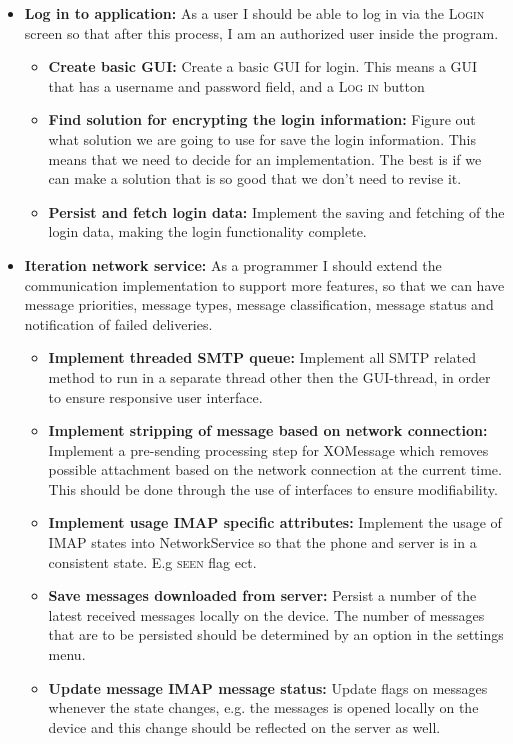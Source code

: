 \begin{itemize}
\item{}\textbf{Log in to application:} As a user I should be able to log in via the \textsc{Login} screen so that after this process, I am an authorized user inside the program.
\begin{itemize}
\item{}\textbf{Create basic GUI:} Create a basic GUI for login. This means a GUI that has a username and password field, and a \textsc{Log in} button
\item{}\textbf{Find solution for encrypting the login information:} Figure out what solution we are going to use for save the login information. This means that we need to decide for an implementation. The best is if we can make a solution that is so good that we don’t need to revise it.
\item{}\textbf{Persist and fetch login data:} Implement the saving and fetching of the login data, making the login functionality complete.
\end{itemize}
\item{}\textbf{Iteration network service:} As a programmer I should extend the communication implementation to support more features, so that we can have message priorities, message types, message classification, message status and notification of failed deliveries.
\begin{itemize}
\item{}\textbf{Implement threaded SMTP queue:} Implement all SMTP related method to run in a separate thread other then the GUI-thread, in order to ensure responsive user interface.
\item{}\textbf{Implement stripping of message based on network connection:} Implement a pre-sending processing step for XOMessage which removes possible attachment based on the network connection at the current time. This should be done through the use of interfaces to ensure modifiability. 
\item{}\textbf{Implement usage IMAP specific attributes:} Implement the usage of IMAP states into NetworkService so that the phone and server is in a consistent state. E.g \textsc{seen} flag ect. 
\item{}\textbf{Save messages downloaded from server:} Persist a number of the latest received messages locally on the device. The number of messages that are to be persisted should be determined by an option in the settings menu.
\item{}\textbf{Update message IMAP message status:} Update flags on messages whenever the state changes, e.g. the messages is opened locally on the device and this change should be reflected on the server as well.

\end{itemize}
\end{itemize}
